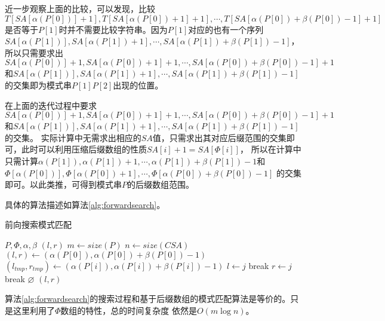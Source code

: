 近一步观察上面的比较，可以发现，比较$T[SA[\alpha(P[0])]+1],T[SA[\alpha(P[0])+1]+1],\cdots ,T[SA[\alpha(P[0])+\beta(P[0])-1]+1]$
是否等于$P[1]$时并不需要比较字符串。因为$P[1]$对应的也有一个序列$SA[\alpha(P[1])],SA[\alpha(P[1])+1],\cdots ,SA[\alpha(P[1])+\beta(P[1])-1]$，所以只需要求出
$SA[\alpha(P[0])]+1,SA[\alpha(P[0])+1]+1,\cdots ,SA[\alpha(P[0])+\beta(P[0])-1]+1$和$SA[\alpha(P[1])],SA[\alpha(P[1])+1],\cdots ,SA[\alpha(P[1])+\beta(P[1])-1]$
的交集即为模式串$P[1]P[2]$出现的位置。

在上面的迭代过程中要求$SA[\alpha(P[0])]+1,SA[\alpha(P[0])+1]+1,\cdots ,SA[\alpha(P[0])+\beta(P[0])-1]+1$和$SA[\alpha(P[1])],SA[\alpha(P[1])+1],\cdots ,SA[\alpha(P[1])+\beta(P[1])-1]$的交集。
实际计算中无需求出相应的$SA$值，只需求出其对应后缀范围的交集即可，此时可以利用压缩后缀数组的性质$SA[i]+1=SA[\Phi[i]]$，
所以在计算中只需计算$\alpha(P[1]),\alpha(P[1])+1,\cdots , \alpha(P[1])+\beta(P[1])-1$和$\Phi[\alpha(P[0])],\Phi[\alpha(P[0])+1],\cdots , \Phi[\alpha(P[0])+\beta(P[0])-1]$
的交集即可。以此类推，可得到模式串$P$的后缀数组范围。

具体的算法描述如算法\ref{alg:forwardsearch}。

\begin{algorithm}
    \caption{前向搜索模式匹配}
    \label{alg:forwardsearch}
    \begin{algorithmic}[1]
        \Require $P,\Phi,\alpha,\beta$
        \Ensure $(l,r)$
        \State $m \gets size(P)$
        \State $n \gets size(CSA)$
        \State $(l,r) \gets (\alpha(P[0]),\alpha(P[0])+\beta(P[0])-1)$
            \State $(l_{tmp},r_{tmp}) \gets (\alpha(P[i]),\alpha(P[i])+\beta(P[i])-1)$
                \State $l\gets j$
                \State break
            \EndIf
            \EndFor
                \State $r\gets j$
                \State break
            \EndIf
            \EndFor
                \State \Return $\varnothing$
            \EndIf
        \EndFor
        \State \Return $(l,r)$
        \EndFunction
    \end{algorithmic}
\end{algorithm}

算法\ref{alg:forwardsearch}的搜索过程和基于后缀数组的模式匹配算法是等价的。只是这里利用了$\Phi$数组的特性，总的时间复杂度
依然是$O(m\log n)$。

